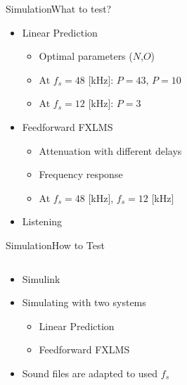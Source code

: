 \begin{frame}{Simulation}{What to test?}	
\begin{itemize}
	\item Linear Prediction
	\begin{itemize}
		\item Optimal parameters ($N$,$O$)
		\item At  $f_s = 48$ [kHz]: $P=43$, $P=10$
		\item At  $f_s = 12$ [kHz]: $P=3$ 
	\end{itemize}
	\item Feedforward FXLMS	
	\begin{itemize}
		\item Attenuation with different delays
		\item Frequency response
		\item At  $f_s = 48$ [kHz],  $f_s = 12$ [kHz] 
	\end{itemize}
	\item Listening
\end{itemize}
\end{frame}

\begin{frame}{Simulation}{How to Test}	
\begin{columns}
		\begin{column}{0.6\textwidth}				
		\begin{itemize}
			\item Simulink
			\item Simulating with two systems 
			\begin{itemize}
				\item Linear Prediction
				\item Feedforward FXLMS
			\end{itemize}
			\item Sound files are adapted to used $f_s$ 
		\end{itemize}
		\end{column}
		\begin{column}{0.4\textwidth}
		\end{column}
	\end{columns}
\end{frame}

